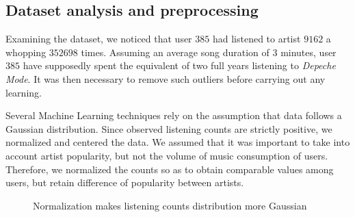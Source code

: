 \documentclass{article}
\begin{document}
  \subsection{Dataset analysis and preprocessing}
  Examining the dataset, we noticed that user $385$ had listened to artist $9162$ a whopping $352698$ times. Assuming an average song duration of $3$ minutes, user $385$ have supposedly spent the equivalent of two full years listening to \textit{Depeche Mode}. It was then necessary to remove such outliers before carrying out any learning.

  Several Machine Learning techniques rely on the assumption that data follows a Gaussian distribution. Since observed listening counts are strictly positive, we normalized and centered the data. We assumed that it was important to take into account artist popularity, but not the volume of music consumption of users. Therefore, we normalized the counts so as to obtain comparable values among users, but retain difference of popularity between artists.

  \begin{figure}[ht]
    \center
    \caption{Normalization makes listening counts distribution more Gaussian}
    \label{fig:recommendation-normalization}
  \end{figure}
\end{document}
